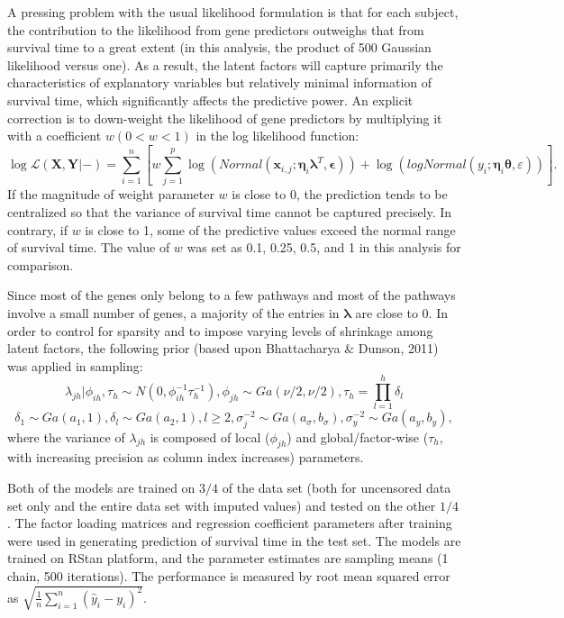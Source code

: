 \documentclass[a4paper]{article}
\begin{document}
A pressing problem with the usual likelihood formulation is that for each subject, the contribution to the likelihood from gene predictors outweighs that from survival time to a great extent (in this analysis, the product of 500 Gaussian likelihood versus one). As a result, the latent factors will capture primarily the characteristics of explanatory variables but relatively minimal information of survival time, which significantly affects the predictive power. An explicit correction is to down-weight the likelihood of gene predictors by multiplying it with a coefficient $w (0 < w < 1)$ in the log likelihood function: $$\log \mathcal{L}(\mathbf{X}, \mathbf{Y}|-) = \sum_{i = 1}^{n}[w\sum_{j = 1}^{p}\log(Normal(\mathbf{x}_{i, j}; \bm{\eta}_{i}\bm{\lambda}^{T}, \bm{\epsilon})) + \log(logNormal(y_{i}; \bm{\eta}_{i}\bm{\theta}, \varepsilon))].$$ If the magnitude of weight parameter $w$ is close to 0, the prediction tends to be centralized so that the variance of survival time cannot be captured precisely. In contrary, if $w$ is close to 1, some of the predictive values exceed the normal range of survival time. The value of $w$ was set as 0.1, 0.25, 0.5, and 1 in this analysis for comparison.

Since most of the genes only belong to a few pathways and most of the pathways involve a small number of genes, a majority of the entries in $\bm{\lambda}$ are close to 0. In order to control for sparsity and to impose varying levels of shrinkage among latent factors, the following prior (based upon Bhattacharya \& Dunson, 2011) was applied in sampling: 
$$\lambda_{jh}|\phi_{ih}, \tau_{h} \sim N(0, \phi_{ih}^{-1}\tau_{h}^{-1}), \phi_{jh} \sim Ga(\nu/2, \nu/2), \tau_{h} = \prod_{l = 1}^{h}\delta_{l}$$
$$\delta_{1} \sim Ga(a_{1}, 1), \delta_{l} \sim Ga(a_{2}, 1), l \geq 2, \sigma_{j}^{-2} \sim Ga(a_{\sigma}, b_{\sigma}), \sigma_{y}^{-2} \sim Ga(a_{y}, b_{y}),$$ where the variance of $\lambda_{jh}$ is composed of local ($\phi_{jh}$) and global/factor-wise ($\tau_{h}$, with increasing precision as column index increases) parameters.

Both of the models are trained on $3/4$ of the data set (both for uncensored data set only and the entire data set with imputed values) and tested on the other $1/4$. The factor loading matrices and regression coefficient parameters after training were used in generating prediction of survival time in the test set. The models are trained on RStan platform, and the parameter estimates are sampling means (1 chain, 500 iterations). The performance is measured by root mean squared error as $\sqrt{\frac{1}{n}\sum_{i = 1}^{n}(\hat{y}_{i} - y_{i})^{2}}$.
\end{document}
